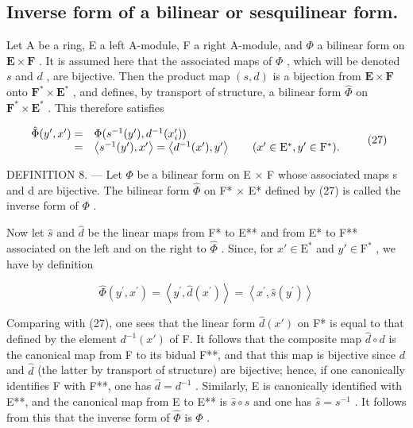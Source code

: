 \subsection{Inverse form of a bilinear or sesquilinear form.}

Let A be a ring, E a left A-module, F a right A-module, and \(\Phi\) a bilinear form on \(\mathbf{E} \times \mathbf{F}\) . It is assumed here that the associated maps of \(\Phi\) , which will be denoted \(s\) and \(d\) , are bijective. Then the product map \((s, d)\) is a bijection from \(\mathbf{E} \times \mathbf{F}\) onto \(\mathbf{F}^* \times \mathbf{E}^*\) , and defines, by transport of structure, a bilinear form \(\hat{\Phi}\) on \(\mathbf{F}^* \times \mathbf{E}^*\) . This therefore satisfies

\[
\begin{array}{r l} \hat {\Phi} (y ^ {\prime}, x ^ {\prime}) = & \Phi (s ^ {- 1} (y ^ {\prime}), d ^ {- 1} (x _ {i} ^ {\prime})) \\ = & \left\langle s ^ {- 1} (y ^ {\prime}), x ^ {\prime} \right\rangle = \left\langle d ^ {- 1} (x ^ {\prime}), y ^ {\prime} \right\rangle \qquad (x ^ {\prime} \in \mathrm{E} ^ {*}, y ^ {\prime} \in \mathrm{F} ^ {*}). \end{array}\tag{27}
\]

DEFINITION 8. --- Let \(\Phi\) be a bilinear form on E × F whose associated maps s and d are bijective. The bilinear form \(\hat{\Phi}\) on F* × E* defined by (27) is called the inverse form of \(\Phi\) .

Now let \(\hat{s}\) and \(\hat{d}\) be the linear maps from F* to E** and from E* to F** associated on the left and on the right to \(\hat{\Phi}\) . Since, for \(x' \in \mathrm{E}^*\) and \(y' \in \mathrm{F}^*\) , we have by definition

\[
\hat {\Phi} (y ^ {\prime}, x ^ {\prime}) = \left\langle y ^ {\prime}, \hat {d} (x ^ {\prime}) \right\rangle = \left\langle x ^ {\prime}, \hat {s} (y ^ {\prime}) \right\rangle
\]

Comparing with (27), one sees that the linear form \(\hat{d}(x')\) on F* is equal to that defined by the element \(d^{-1}(x')\) of F. It follows that the composite map \(\hat{d} \circ d\) is the canonical map from F to its bidual F**, and that this map is bijective since \(d\) and \(\hat{d}\) (the latter by transport of structure) are bijective; hence, if one canonically identifies F with F**, one has \(\hat{d} = d^{-1}\) . Similarly, E is canonically identified with E**, and the canonical map from E to E** is \(\hat{s} \circ s\) and one has \(\hat{s} = s^{-1}\) . It follows from this that the inverse form of \(\hat{\Phi}\) is \(\Phi\) .

